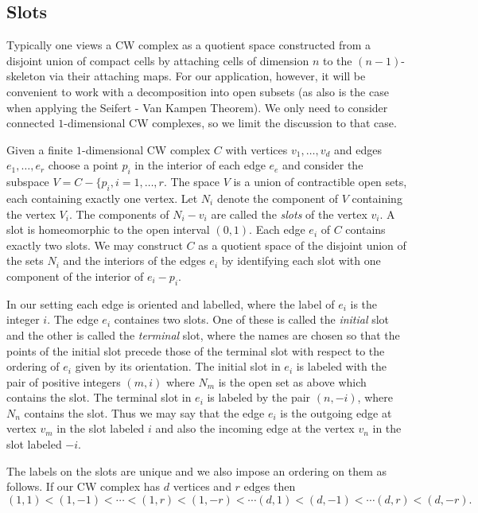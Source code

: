 \documentclass[12pt]{article}
\begin{document}
   \subsection{Slots}

   Typically one views a CW complex as a quotient space constructed from a
   disjoint union of compact cells by attaching cells of dimension $n$ to the
   $(n-1)$-skeleton via their attaching maps.  For our application, however, it
   will be convenient to work with a decomposition into open subsets (as also is
   the case when applying the Seifert - Van Kampen Theorem).  We only need to
   consider connected $1$-dimensional CW complexes, so we limit the discussion
   to that case.

   Given a finite $1$-dimensional CW complex $C$ with vertices $v_1, \ldots,
   v_d$ and edges $e_1, \ldots, e_r$ choose a point $p_i$ in the interior of
   each edge $e_e$ and consider the subspace $V = C - \{p_i, i=1, \ldots, r$.
   The space $V$ is a union of contractible open sets, each containing exactly
   one vertex.  Let $N_i$ denote the component of $V$ containing the vertex
   $V_i$.  The components of $N_i - v_i$ are called the {\it slots} of the
   vertex $v_i$.  A slot is homeomorphic to the open interval $(0, 1)$.
   Each edge $e_i$ of $C$ contains exactly two slots.  We may construct $C$
   as a quotient space of the disjoint union of the sets $N_i$ and the interiors
   of the edges $e_i$ by identifying each slot with one component of the
   interior of $e_i - p_i$.

   In our setting each edge is oriented and labelled, where the label of
   $e_i$ is the integer $i$.  The edge $e_i$ containes two slots.  One of
   these is called the {\it initial} slot and the other is called the {\it
     terminal} slot, where the names are chosen so that the points of the
   initial slot precede those of the terminal slot with respect to the ordering
   of $e_i$ given by its orientation.  The initial slot in $e_i$ is labeled with
   the pair of positive integers $(m, i)$ where $N_m$ is the open set as above
   which contains the slot.  The terminal slot in $e_i$ is labeled by the pair
   $(n, -i)$, where $N_n$ contains the slot.  Thus we may say that the
   edge $e_i$ is the outgoing edge at vertex $v_m$ in the slot labeled $i$
   and also the incoming edge at the vertex $v_n$ in the slot labeled $-i$.

   The labels on the slots are unique and we also impose an ordering on them
   as follows.  If our CW complex has $d$ vertices and $r$ edges then
   $$(1, 1) < (1, -1) < \cdots < (1, r) < (1, -r) < \cdots (d, 1) < (d, -1) <
   \cdots (d, r) < (d, -r) .$$
\end{document}

